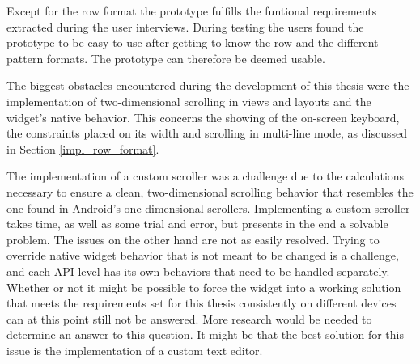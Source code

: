 Except for the row format the prototype fulfills the funtional requirements extracted during the user interviews. During testing the users found the prototype to be easy to use after getting to know the row and the different pattern formats. The prototype can therefore be deemed usable.

The biggest obstacles encountered during the development of this thesis were the implementation of two-dimensional scrolling in views and layouts and the  widget's native behavior. This concerns the showing of the on-screen keyboard, the constraints placed on its width and scrolling in multi-line mode, as discussed in Section \ref{impl_row_format}.

The implementation of a custom scroller was a challenge due to the calculations necessary to ensure a clean, two-dimensional scrolling behavior that resembles the one found in Android's one-dimensional scrollers. Implementing a custom scroller takes time, as well as some trial and error, but presents in the end a solvable problem. The  issues on the other hand are not as easily resolved. Trying to override native widget behavior that is not meant to be changed is a challenge, and each \gls{API} level has its own behaviors that need to be handled separately. Whether or not it might be possible to force the  widget into a working solution that meets the requirements set for this thesis consistently on different devices can at this point still not be answered. More research would be needed to determine an answer to this question. It might be that the best solution for this issue is the implementation of a custom text editor.